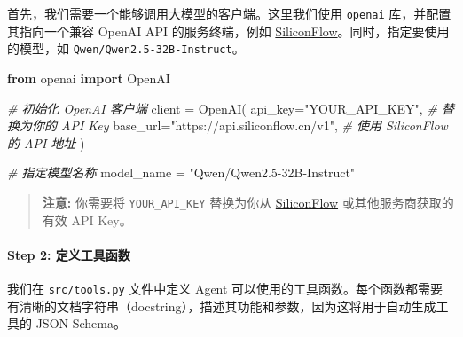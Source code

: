 \documentclass[
]{article}
\newenvironment{Shaded}{}{}
\newcommand{\CommentTok}[1]{\textcolor[rgb]{0.38,0.63,0.69}{\textit{#1}}}
\newcommand{\ImportTok}[1]{\textcolor[rgb]{0.00,0.50,0.00}{\textbf{#1}}}
\newcommand{\NormalTok}[1]{#1}
\newcommand{\OperatorTok}[1]{\textcolor[rgb]{0.40,0.40,0.40}{#1}}
\newcommand{\StringTok}[1]{\textcolor[rgb]{0.25,0.44,0.63}{#1}}
\begin{document}
首先，我们需要一个能够调用大模型的客户端。这里我们使用 \texttt{openai}
库，并配置其指向一个兼容 OpenAI API 的服务终端，例如
\href{https://cloud.siliconflow.cn/i/ybUFvmqK}{SiliconFlow}。同时，指定要使用的模型，如
\texttt{Qwen/Qwen2.5-32B-Instruct}。

\begin{Shaded}
\begin{Highlighting}[]
\ImportTok{from}\NormalTok{ openai }\ImportTok{import}\NormalTok{ OpenAI}

\CommentTok{\# 初始化 OpenAI 客户端}
\NormalTok{client }\OperatorTok{=}\NormalTok{ OpenAI(}
\NormalTok{    api\_key}\OperatorTok{=}\StringTok{"YOUR\_API\_KEY"}\NormalTok{,  }\CommentTok{\# 替换为你的 API Key}
\NormalTok{    base\_url}\OperatorTok{=}\StringTok{"https://api.siliconflow.cn/v1"}\NormalTok{, }\CommentTok{\# 使用 SiliconFlow 的 API 地址}
\NormalTok{)}

\CommentTok{\# 指定模型名称}
\NormalTok{model\_name }\OperatorTok{=} \StringTok{"Qwen/Qwen2.5{-}32B{-}Instruct"}
\end{Highlighting}
\end{Shaded}

\begin{quote}
\textbf{注意:} 你需要将 \texttt{YOUR\_API\_KEY} 替换为你从
\href{https://cloud.siliconflow.cn/i/ybUFvmqK}{SiliconFlow}
或其他服务商获取的有效 API Key。
\end{quote}

\paragraph{Step 2:
定义工具函数}\label{step-2-ux5b9aux4e49ux5de5ux5177ux51fdux6570}

我们在 \texttt{src/tools.py} 文件中定义 Agent
可以使用的工具函数。每个函数都需要有清晰的文档字符串（docstring），描述其功能和参数，因为这将用于自动生成工具的
JSON Schema。
\end{document}
